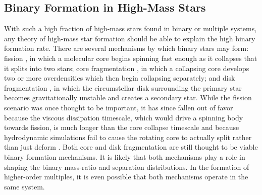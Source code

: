 \subsection{Binary Formation in High-Mass Stars}
\label{paper1_sec:formation}
With such a high fraction of high-mass stars found in binary or multiple
systems, any theory of high-mass star formation should be able to
explain the high binary formation rate. There are several mechanisms by
which binary stars may form: fission \citep{Lyttleton1953,
  Lebovitz1974, Lebovitz1984}, in which a molecular core begins
spinning fast enough as it collapses that it splits into two stars;
core fragmentation \citep[see e.g.][]{Boss1979, Boss1986, Bate1995}, in which a collapsing core develops two or more
overdensities which then begin collapsing separately; and disk
fragmentation \citep[see e.g.][]{Kratter2006, Stamatellos2011}, in which the circumstellar disk surrounding the primary
star becomes gravitationally unstable and creates a secondary
star. While the fission scenario was once thought to be important, it
has since fallen out of favor because the viscous dissipation timescale, which would drive a spinning body towards fission, is much longer than the core collapse timescale \citep{Tohline2002} and because hydrodynamic simulations fail to cause
the rotating core to actually split rather than just deform
\citep{Tohline2001}. Both core and disk fragmentation are still
thought to be viable binary formation mechanisms. It is likely that
both mechanisms play a role in shaping the binary mass-ratio and
separation distributions. In the formation of higher-order multiples, it is even possible that both mechanisms operate in the same system.

